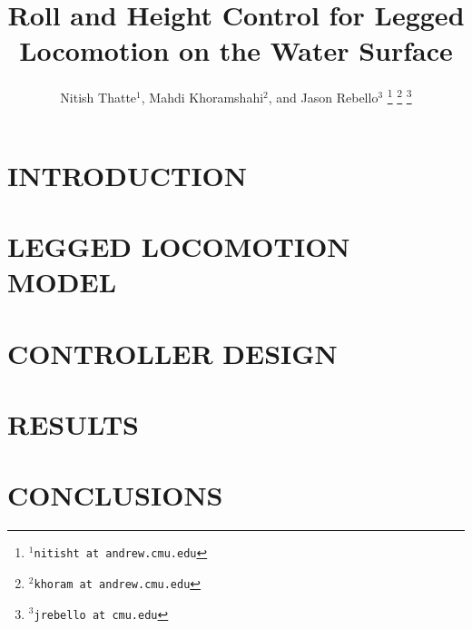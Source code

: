 \documentclass[letterpaper, 10 pt, conference]{ieeeconf}  %
\title{\LARGE \bf
    Roll and Height Control for Legged Locomotion on the Water Surface
}
\author{Nitish Thatte$^{1}$, Mahdi Khoramshahi$^{2}$, and Jason Rebello$^{3}$%
\thanks{$^{1}${\tt\small nitisht at andrew.cmu.edu}}%
\thanks{$^{2}${\tt\small khoram at andrew.cmu.edu}}
\thanks{$^{3}${\tt\small jrebello at cmu.edu}}
}
\begin{document}
\maketitle
\thispagestyle{empty}
\pagestyle{empty}

\begin{abstract}
	
\end{abstract}

\section{INTRODUCTION}

\section{LEGGED LOCOMOTION MODEL}


\section{CONTROLLER DESIGN}


\section{RESULTS}


\section{CONCLUSIONS}





\end{document}
